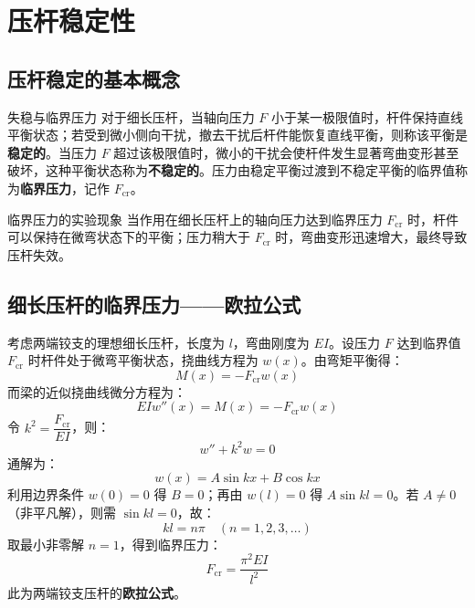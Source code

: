 \chapter{压杆稳定性}


\section{压杆稳定的基本概念}

\begin{mydefinition}{失稳与临界压力}
    对于细长压杆，当轴向压力 \(F\) 小于某一极限值时，杆件保持直线平衡状态；若受到微小侧向干扰，撤去干扰后杆件能恢复直线平衡，则称该平衡是\textbf{稳定的}。当压力 \(F\) 超过该极限值时，微小的干扰会使杆件发生显著弯曲变形甚至破坏，这种平衡状态称为\textbf{不稳定的}。压力由稳定平衡过渡到不稳定平衡的临界值称为\textbf{临界压力}，记作 \(F_{\text{cr}}\)。
\end{mydefinition}

\begin{myTheorem}{临界压力的实验现象}
    当作用在细长压杆上的轴向压力达到临界压力 \(F_{\text{cr}}\) 时，杆件可以保持在微弯状态下的平衡；压力稍大于 \(F_{\text{cr}}\) 时，弯曲变形迅速增大，最终导致压杆失效。
\end{myTheorem}

\section{细长压杆的临界压力——欧拉公式}

考虑两端铰支的理想细长压杆，长度为 \(l\)，弯曲刚度为 \(EI\)。设压力 \(F\) 达到临界值 \(F_{\text{cr}}\) 时杆件处于微弯平衡状态，挠曲线方程为 \(w(x)\)。由弯矩平衡得：
\[
M(x) = -F_{\text{cr}} w(x)
\]
而梁的近似挠曲线微分方程为：
\[
EI w''(x) = M(x) = -F_{\text{cr}} w(x)
\]
令 \(k^2 = \dfrac{F_{\text{cr}}}{EI}\)，则：
\[
w'' + k^2 w = 0
\]
通解为：
\[
w(x) = A \sin kx + B \cos kx
\]
利用边界条件 \(w(0)=0\) 得 \(B=0\)；再由 \(w(l)=0\) 得 \(A \sin kl = 0\)。若 \(A \neq 0\)（非平凡解），则需 \(\sin kl = 0\)，故：
\[
kl = n\pi \quad (n=1,2,3,\dots)
\]
取最小非零解 \(n=1\)，得到临界压力：
\[
F_{\text{cr}} = \frac{\pi^2 EI}{l^2}
\]
此为两端铰支压杆的\textbf{欧拉公式}。

